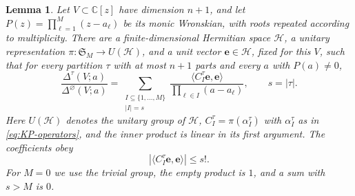 \documentclass[11pt,letterpaper,reqno]{amsart}
\newtheorem{lem}[thm]{Lemma}
\theoremstyle{remark}
\numberwithin{equation}{section}
\newcommand{\C}{\mathbb C}
\newcommand{\ev}{\bm e}
\begin{document}
\begin{lem}\label{lem:universal-minors}
Let $V\subset\C[z]$ have dimension $n+1$, and let
$P(z)=\prod_{\ell=1}^M(z-a_\ell)$ be its monic Wronskian, with roots
repeated according to multiplicity. There are a finite-dimensional
Hermitian space $\mathcal H$, a unitary representation
$\pi\colon\mathfrak S_M\to U(\mathcal H)$, and a unit vector
$\ev\in\mathcal H$, fixed for this $V$, such that for every partition
$\tau$ with at most $n+1$ parts and every $a$ with $P(a)\ne0$,
\begin{equation}\label{eq:universal-minors}
 \frac{\Delta^\tau(V;a)}{\Delta^\varnothing(V;a)}
 =\sum_{\substack{I\subseteq\{1,\ldots,M\}\\|I|=s}}
   \frac{\langle C_I^\tau\ev,\ev\rangle}
        {\prod_{\ell\in I}(a-a_\ell)},
 \qquad s=|\tau|.
\end{equation}
Here $U(\mathcal H)$ denotes the unitary group of $\mathcal H$,
$C_I^\tau=\pi(\alpha_I^\tau)$ with $\alpha_I^\tau$ as in
\eqref{eq:KP-operators}, and the inner product is linear in its first
argument. The coefficients obey
\begin{equation}\label{eq:projectionbound}
 |\langle C_I^\tau\ev,\ev\rangle|\leq s!.
\end{equation}
For $M=0$ we use the trivial group, the empty product is $1$, and a sum
with $s>M$ is $0$.
\end{lem}
\end{document}
